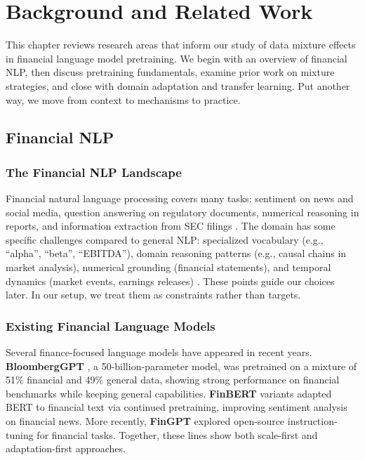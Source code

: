 \chapter{Background and Related Work}

This chapter reviews research areas that inform our study of data mixture effects in financial language model pretraining. We begin with an overview of financial NLP, then discuss pretraining fundamentals, examine prior work on mixture strategies, and close with domain adaptation and transfer learning. Put another way, we move from context to mechanisms to practice.

\section{Financial NLP}

\subsection{The Financial NLP Landscape}

Financial natural language processing covers many tasks: sentiment on news and social media, question answering on regulatory documents, numerical reasoning in reports, and information extraction from SEC filings \parencite{araci2019finbert, chen2021finqa}. The domain has some specific challenges compared to general NLP: specialized vocabulary (e.g., ``alpha'', ``beta'', ``EBITDA''), domain reasoning patterns (e.g., causal chains in market analysis), numerical grounding (financial statements), and temporal dynamics (market events, earnings releases) \parencite{wu2023bloomberggpt, araci2019finbert}. These points guide our choices later. In our setup, we treat them as constraints rather than targets.

\subsection{Existing Financial Language Models}

Several finance-focused language models have appeared in recent years. \textbf{BloombergGPT} \parencite{wu2023bloomberggpt}, a 50-billion-parameter model, was pretrained on a mixture of 51\% financial and 49\% general data, showing strong performance on financial benchmarks while keeping general capabilities. \textbf{FinBERT} variants \parencite{araci2019finbert, yang2020finbert} adapted BERT to financial text via continued pretraining, improving sentiment analysis on financial news. More recently, \textbf{FinGPT} \parencite{yang2023fingpt} explored open-source instruction-tuning for financial tasks. Together, these lines show both scale-first and adaptation-first approaches.

